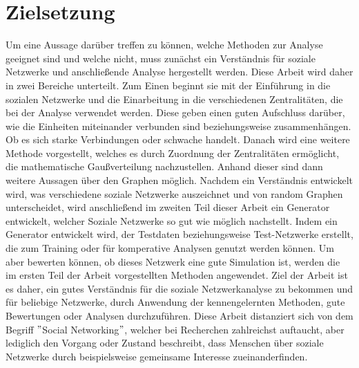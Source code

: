 \section{Zielsetzung}\label{sec:zielsetzung}
Um eine Aussage darüber treffen zu können, welche Methoden zur Analyse geeignet sind und welche nicht, muss zunächst ein Verständnis für soziale Netzwerke und anschließende Analyse hergestellt werden. Diese Arbeit wird daher in zwei Bereiche unterteilt. Zum Einen beginnt sie mit der Einführung in die sozialen Netzwerke und die Einarbeitung in die verschiedenen Zentralitäten, die bei der Analyse verwendet werden. Diese geben einen guten Aufschluss darüber, wie die Einheiten miteinander verbunden sind beziehungsweise zusammenhängen. Ob es sich starke Verbindungen oder schwache handelt. Danach wird eine weitere Methode vorgestellt, welches es durch Zuordnung der Zentralitäten ermöglicht, die mathematische Gaußverteilung nachzustellen. Anhand dieser sind dann weitere Aussagen über den Graphen möglich. Nachdem ein Verständnis entwickelt wird, was verschiedene soziale Netzwerke auszeichnet und von random Graphen unterscheidet, wird anschließend im zweiten Teil dieser Arbeit ein Generator entwickelt, welcher Soziale Netzwerke so gut wie möglich nachstellt. Indem ein Generator entwickelt wird, der Testdaten beziehungsweise Test-Netzwerke erstellt, die zum Training oder für komperative Analysen genutzt werden können. Um aber bewerten können, ob dieses Netzwerk eine gute Simulation ist, werden die im ersten Teil der Arbeit vorgestellten Methoden angewendet. Ziel der Arbeit ist es daher, ein gutes Verständnis für die soziale Netzwerkanalyse zu bekommen und für beliebige Netzwerke, durch Anwendung der kennengelernten Methoden, gute Bewertungen oder Analysen durchzuführen.
Diese Arbeit distanziert sich von dem Begriff $"$Social Networking$"$, welcher bei Recherchen zahlreichst auftaucht, aber lediglich den Vorgang oder Zustand beschreibt, dass Menschen über soziale Netzwerke durch beispielsweise gemeinsame Interesse zueinanderfinden. 




